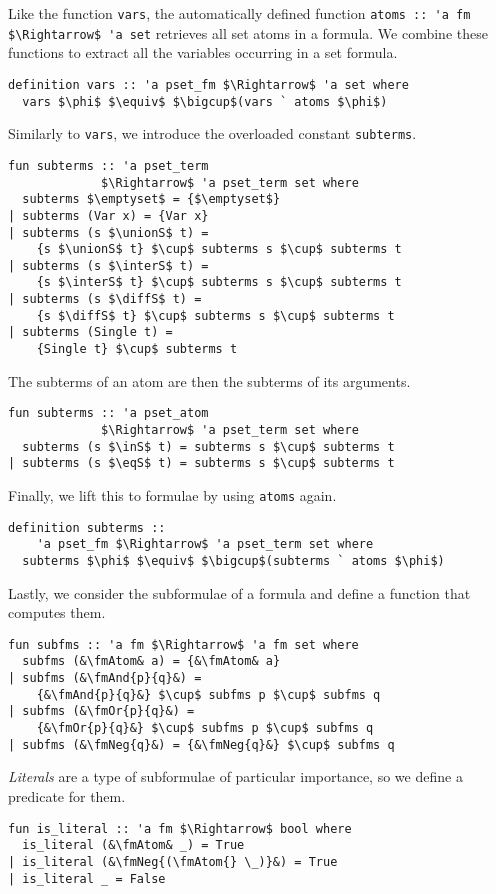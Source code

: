 \documentclass[sigplan,10pt,anonymous,review]{acmart}
\newcommand{\unionS}{\sqcup_\text{s}}
\newcommand{\interS}{\sqcap_\text{s}}
\newcommand{\diffS}{-_\text{s}}
\newcommand{\inS}{\in_\text{s}}
\newcommand{\eqS}{=_\text{s}}
\newcommand{\fmAnd}[2]{#1 $\boldsymbol{\land}$ #2}
\newcommand{\fmOr}[2]{#1 $\boldsymbol{\lor}$ #2}
\newcommand{\fmNegSymbol}{\boldsymbol{\neg}}
\newcommand{\fmNeg}[1]{$\fmNegSymbol$ #1}
\newcommand{\fmAtom}{\textbf{A}}
\begin{document}
Like the function \lstinline!vars!, the automatically defined function \lstinline!atoms :: 'a fm $\Rightarrow$ 'a set! retrieves all set atoms in a formula.
We combine these functions to extract all the variables occurring in a set formula.
\begin{lstlisting}
definition vars :: 'a pset_fm $\Rightarrow$ 'a set where
  vars $\phi$ $\equiv$ $\bigcup$(vars ` atoms $\phi$)
\end{lstlisting}

Similarly to \lstinline!vars!, we introduce the overloaded constant \lstinline!subterms!.
\begin{lstlisting}
fun subterms :: 'a pset_term
             $\Rightarrow$ 'a pset_term set where
  subterms $\emptyset$ = {$\emptyset$}
| subterms (Var x) = {Var x}
| subterms (s $\unionS$ t) =
    {s $\unionS$ t} $\cup$ subterms s $\cup$ subterms t
| subterms (s $\interS$ t) =
    {s $\interS$ t} $\cup$ subterms s $\cup$ subterms t
| subterms (s $\diffS$ t) =
    {s $\diffS$ t} $\cup$ subterms s $\cup$ subterms t
| subterms (Single t) =
    {Single t} $\cup$ subterms t
\end{lstlisting}
The subterms of an atom are then the subterms of its arguments.
\begin{lstlisting}
fun subterms :: 'a pset_atom
             $\Rightarrow$ 'a pset_term set where
  subterms (s $\inS$ t) = subterms s $\cup$ subterms t
| subterms (s $\eqS$ t) = subterms s $\cup$ subterms t
\end{lstlisting}
Finally, we lift this to formulae by using \lstinline!atoms! again.
\begin{lstlisting}
definition subterms ::
    'a pset_fm $\Rightarrow$ 'a pset_term set where
  subterms $\phi$ $\equiv$ $\bigcup$(subterms ` atoms $\phi$)
\end{lstlisting}

Lastly, we consider the subformulae of a formula and define a function that computes them.
\begin{lstlisting}
fun subfms :: 'a fm $\Rightarrow$ 'a fm set where
  subfms (&\fmAtom& a) = {&\fmAtom& a}
| subfms (&\fmAnd{p}{q}&) =
    {&\fmAnd{p}{q}&} $\cup$ subfms p $\cup$ subfms q
| subfms (&\fmOr{p}{q}&) =
    {&\fmOr{p}{q}&} $\cup$ subfms p $\cup$ subfms q
| subfms (&\fmNeg{q}&) = {&\fmNeg{q}&} $\cup$ subfms q
\end{lstlisting}
\textit{Literals} are a type of subformulae of particular importance, so we define a predicate for them.
\begin{lstlisting}
fun is_literal :: 'a fm $\Rightarrow$ bool where
  is_literal (&\fmAtom& _) = True
| is_literal (&\fmNeg{(\fmAtom{} \_)}&) = True
| is_literal _ = False
\end{lstlisting}
\end{document}
